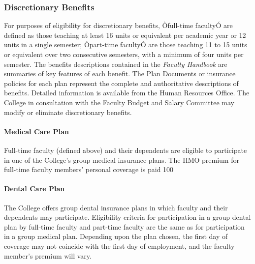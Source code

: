 \documentclass[letterpaper, 11pt]{article}
\begin{document}
		\subsubsection{Discretionary Benefits}
			For purposes of eligibility for discretionary benefits, Òfull-time facultyÓ are defined as those teaching at least 16 units or equivalent per academic year or 12 units in a single semester; Òpart-time facultyÓ are those teaching 11 to 15 units or equivalent over two consecutive semesters, with a minimum of four units per semester.  The benefits descriptions contained in the \emph{Faculty Handbook} are summaries of key features of each benefit.  The Plan Documents or insurance policies for each plan represent the complete and authoritative descriptions of benefits.  Detailed information is available from the Human Resources Office.  The College in consultation with the Faculty Budget and Salary Committee may modify or eliminate discretionary benefits.
			\paragraph{Medical Care Plan}
				Full-time faculty (defined above) and their dependents are eligible to participate in one of the College's group medical insurance plans.  The HMO premium for full-time faculty members' personal coverage is paid 100%
			\paragraph{Dental Care Plan}
				The College offers group dental insurance plans in which faculty and their dependents may participate.  Eligibility criteria for participation in a group dental plan by full-time faculty and part-time faculty are the same as for participation in a group medical plan.  Depending upon the plan chosen, the first day of coverage may not coincide with the first day of employment, and the faculty member's premium will vary.
\end{document}
